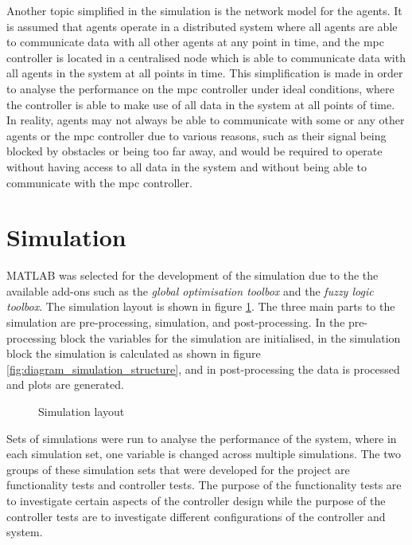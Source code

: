 \documentclass[conference]{IEEEtran}
\begin{document}
Another topic simplified in the simulation is the network model for the agents.
It is assumed that agents operate in a distributed system where all agents are able to communicate data with all other agents at any point in time, and the \gls{mpc} controller is located in a centralised node which is able to communicate data with all agents in the system at all points in time.
This simplification is made in order to analyse the performance on the \gls{mpc} controller under ideal conditions, where the controller is able to make use of all data in the system at all points of time.
In reality, agents may not always be able to communicate with some or any other agents or the \gls{mpc} controller due to various reasons, such as their signal being blocked by obstacles or being too far away, and would be required to operate without having access to all data in the system and without being able to communicate with the \gls{mpc} controller.

\section{Simulation} \label{sec:simulation}

MATLAB was selected for the development of the simulation due to the the available add-ons such as the \textit{global optimisation toolbox} and the \textit{fuzzy logic toolbox}.
The simulation layout is shown in figure \ref{fig:diagram_simulation_layout}.
The three main parts to the simulation are pre-processing, simulation, and post-processing.
In the pre-processing block the variables for the simulation are initialised, in the simulation block the simulation is calculated as shown in figure \ref{fig:diagram_simulation_structure}, and in post-processing the data is processed and plots are generated.

\begin{figure}
    \centering
    
    \caption{Simulation layout}
    \label{fig:diagram_simulation_layout}
\end{figure}

Sets of simulations were run to analyse the performance of the system, where in each simulation set, one variable is changed across multiple simulations.
The two groups of these simulation sets that were developed for the project are functionality tests and controller tests.
The purpose of the functionality tests are to investigate certain aspects of the controller design while the purpose of the controller tests are to investigate different configurations of the controller and system.
\end{document}
